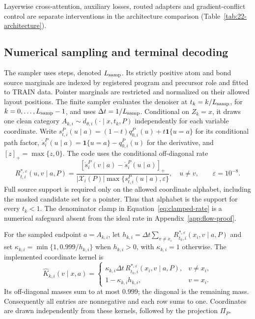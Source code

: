 Layerwise cross-attention, auxiliary losses, routed adapters and gradient-conflict control are
separate interventions in the architecture comparison (Table~\ref{tab:22-architecture}).

\subsection{Numerical sampling and terminal decoding}
\label{app:sampling}

The sampler uses  steps, denoted $L_{\rm samp}$. Its strictly positive atom and bond
source marginals are indexed by registered program and precursor role and fitted to TRAIN data.
Pointer marginals are restricted and normalized on their allowed layout positions. The finite
sampler evaluates the denoiser at $t_k=k/L_{\rm samp}$, for
$k=0,\ldots,L_{\rm samp}-1$, and uses $\Delta t=1/L_{\rm samp}$.
Conditional on $Z_k=x$, it draws one clean category
$A_{k,i}\sim d_{\theta,i}(\cdot\mid x,t_k,P)$ independently for each variable coordinate.
Write $s_{t,i}^P(u\mid a)=(1-t)q_{0,i}^P(u)+t\mathbf1\{u=a\}$ for its conditional path factor,
$\dot s_i^P(u\mid a)=\mathbf1\{u=a\}-q_{0,i}^P(u)$ for the derivative, and
$[z]_+=\max\{z,0\}$. The code uses the conditional off-diagonal rate
\begin{equation}
 R_{t,i}^{*,\varepsilon}(u,v\mid a,P)
 =\frac{[\dot s_i^P(v\mid a)-\dot s_i^P(u\mid a)]_+}
 {|\mathcal X_i(P)|\max\{s_{t,i}^P(u\mid a),\varepsilon\}},
 \quad u\neq v,\qquad \varepsilon=10^{-8}.
 \label{eq:clamped-rate}
\end{equation}
Full source support is required only on the allowed coordinate alphabet, including the masked
candidate set for a pointer. Thus that alphabet is the support for every $t_k<1$.
The denominator clamp in Equation~\ref{eq:clamped-rate} is a numerical safeguard absent from the
ideal rate in Appendix~\ref{app:flow-proof}.

For the sampled endpoint $a=A_{k,i}$, let
$h_{k,i}=\Delta t\sum_{v\neq x_i}R_{t_k,i}^{*,\varepsilon}(x_i,v\mid a,P)$ and set
$\kappa_{k,i}=\min\{1,0.999/h_{k,i}\}$ when $h_{k,i}>0$, with $\kappa_{k,i}=1$ otherwise.
The implemented coordinate kernel is
\begin{equation}
 \widehat K_{k,i}(v\mid x,a)=
 \begin{cases}
 \kappa_{k,i}\Delta t\,R_{t_k,i}^{*,\varepsilon}(x_i,v\mid a,P),&v\neq x_i,\\
 1-\kappa_{k,i}h_{k,i},&v=x_i.
 \end{cases}
 \label{eq:capped-kernel}
\end{equation}
Its off-diagonal masses sum to at most $0.999$; the diagonal is the remaining mass. Consequently
all entries are nonnegative and each row sums to one. Coordinates are drawn independently from
these kernels, followed by the projection $\Pi_P$.

